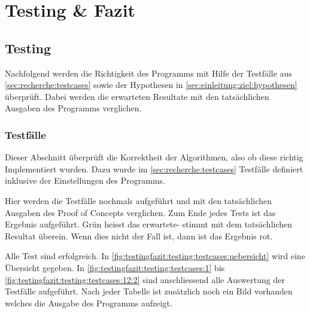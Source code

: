
\chapter{Testing \& Fazit}
\label{sec:testingfazit}

\section{Testing}
\label{sec:testingfazit:testing}
Nachfolgend werden die Richtigkeit des Programms mit Hilfe der Testfälle aus \cref{sec:recherche:testcases}  sowie der Hypothesen in \cref{sec:einleitung:ziel:hypothesen}  überprüft. Dabei werden die erwarteten Resultate mit den tatsächlichen Ausgaben des Programms verglichen.

\subsection{Testfälle}
\label{sec:testingfazit:testing:testcases}
Dieser Abschnitt überprüft die Korrektheit der Algorithmen, also ob diese richtig Implementiert wurden. Dazu wurde im \cref{sec:recherche:testcases} Testfälle definiert inklusive der Einstellungen des Programms.

Hier werden die Testfälle nochmals aufgeführt und mit den tatsächlichen Ausgaben des Proof of Concepts verglichen. Zum Ende jedes Tests ist das Ergebnis aufgeführt. \colorbox{green!25}{Grün} heisst das erwartete- stimmt mit dem tatsächlichen Resultat überein. Wenn dies nicht der Fall ist, dann ist das Ergebnis \colorbox{red!25}{rot}.

Alle Test sind erfolgreich. In \cref{fig:testingfazit:testing:testcases:uebersicht} wird eine Übersicht gegeben. In \cref{fig:testingfazit:testing:testcases:1} bis \cref{fig:testingfazit:testing:testcases:12:2} sind anschliessend alle Auswertung der Testfälle aufgeführt. Nach jeder Tabelle ist zusätzlich noch ein Bild vorhanden welches die Ausgabe des Programms aufzeigt.

